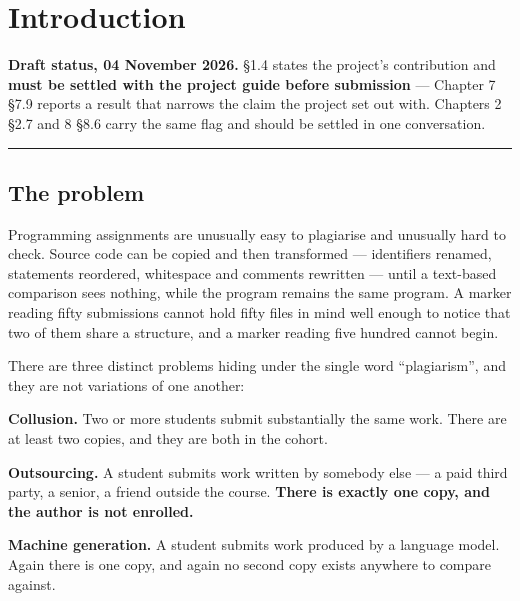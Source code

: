 \hypertarget{introduction}{%
\chapter{Introduction}\label{introduction}}

\begin{draftnote}

\textbf{Draft status, 04 November 2026.} \S{}1.4 states the project's
contribution and \textbf{must be settled with the project guide before
submission} --- Chapter 7 \S{}7.9 reports a result that narrows the claim
the project set out with. Chapters 2 \S{}2.7 and 8 \S{}8.6 carry the same flag
and should be settled in one conversation.

\end{draftnote}

\begin{center}\rule{0.5\linewidth}{0.5pt}\end{center}

\hypertarget{the-problem}{%
\section{The problem}\label{the-problem}}

Programming assignments are unusually easy to plagiarise and unusually
hard to check. Source code can be copied and then transformed ---
identifiers renamed, statements reordered, whitespace and comments
rewritten --- until a text-based comparison sees nothing, while the
program remains the same program. A marker reading fifty submissions
cannot hold fifty files in mind well enough to notice that two of them
share a structure, and a marker reading five hundred cannot begin.

There are three distinct problems hiding under the single word
``plagiarism'', and they are not variations of one another:

\textbf{Collusion.} Two or more students submit substantially the same
work. There are at least two copies, and they are both in the cohort.

\textbf{Outsourcing.} A student submits work written by somebody else
--- a paid third party, a senior, a friend outside the course.
\textbf{There is exactly one copy, and the author is not enrolled.}

\textbf{Machine generation.} A student submits work produced by a
language model. Again there is one copy, and again no second copy exists
anywhere to compare against.

